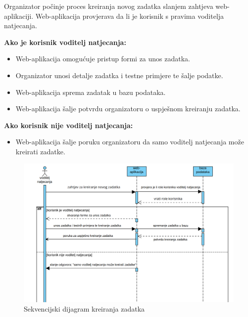 \documentclass{article}
\begin{document}
Organizator počinje proces kreiranja novog zadatka slanjem zahtjeva web-aplikaciji.
Web-aplikacija provjerava da li je korisnik s pravima voditelja natjecanja.

\textbf{Ako je korisnik voditelj natjecanja:}
\begin{itemize}
  \item Web-aplikacija omogućuje pristup formi za unos zadatka.
  \item Organizator unosi detalje zadatka i testne primjere te šalje podatke.
  \item Web-aplikacija sprema zadatak u bazu podataka.
  \item Web-aplikacija šalje potvrdu organizatoru o uspješnom kreiranju zadatka.
\end{itemize}

\textbf{Ako korisnik nije voditelj natjecanja:}
\begin{itemize}
  \item Web-aplikacija šalje poruku organizatoru da samo voditelj natjecanja može kreirati zadatke.
\end{itemize}

\begin{figure}[h!]
  \centering
  \includegraphics[width=\linewidth]{../slike/kreiranje_zadatka.png}
  \caption{Sekvencijski dijagram kreiranja zadatka}\label{fig:taskcreationdiag}
\end{figure}
\end{document}

